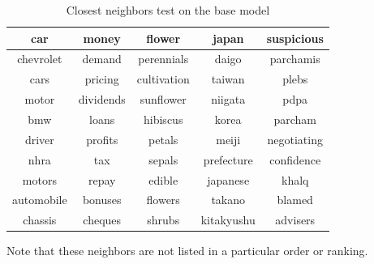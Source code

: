 \begin{table}[ht]
\centering
\begin{tabular}{|c|c|c|c|c|}
\hline
\rowcolor[HTML]{330001} 
{\color[HTML]{FFFFFF} car} & {\color[HTML]{FFFFFF} money} & {\color[HTML]{FFFFFF} flower} & {\color[HTML]{FFFFFF} japan} & {\color[HTML]{FFFFFF} suspicious} \\ \hline
\rowcolor[HTML]{E2EFDA} 
chevrolet                  & demand                       & perennials                    & daigo                        & parchamis                         \\ \hline
cars                       & pricing                      & cultivation                   & taiwan                       & plebs                             \\ \hline
\rowcolor[HTML]{E2EFDA} 
motor                      & dividends                    & sunflower                     & niigata                      & pdpa                              \\ \hline
bmw                        & loans                        & hibiscus                      & korea                        & parcham                           \\ \hline
\rowcolor[HTML]{E2EFDA} 
driver                     & profits                      & petals                        & meiji                        & negotiating                       \\ \hline
nhra                       & tax                          & sepals                        & prefecture                   & confidence                        \\ \hline
\rowcolor[HTML]{E2EFDA} 
motors                     & repay                        & edible                        & japanese                     & khalq                             \\ \hline
automobile                 & bonuses                      & flowers                       & takano                       & blamed                            \\ \hline
\rowcolor[HTML]{E2EFDA} 
chassis                    & cheques                      & shrubs                        & kitakyushu                   & advisers                          \\ \hline
\end{tabular}
\caption{Closest neighbors test on the base model}
\label{tab:neighbors_test}
\end{table}

Note that these neighbors are not listed in a particular order or ranking.